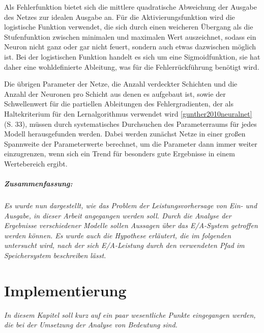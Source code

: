 \documentclass[
	12pt,
	a4paper,
	BCOR10mm,
	DIV14,
	listof=totoc,
	bibliography=totoc,
	headsepline
]{scrreprt}
\begin{document}
Als Fehlerfunktion bietet sich die mittlere quadratische Abweichung der Ausgabe des Netzes zur idealen Ausgabe an.
Für die Aktivierungsfunktion wird die logistische Funktion verwendet, die sich durch einen weicheren Übergang als die Stufenfunktion zwischen minimalen und maximalen Wert auszeichnet, sodass ein Neuron nicht ganz oder gar nicht feuert, sondern auch etwas dazwischen möglich ist. Bei der logistischen Funktion handelt es sich um eine Sigmoidfunktion, sie hat daher eine wohldefinierte Ableitung, was für die Fehlerrückführung benötigt wird. 

Die übrigen Parameter der Netze, die Anzahl verdeckter Schichten und die Anzahl der Neuronen pro Schicht aus denen es aufgebaut ist, sowie der Schwellenwert für die partiellen Ableitungen des Fehlergradienten, der als Haltekriterium für den Lernalgorithmus verwendet wird \ref{gunther2010neuralnet} (S. 33), müssen durch systematisches Durchsuchen des Parameterraums für jedes Modell herausgefunden werden.
Dabei werden zunächst Netze in einer großen Spannweite der Parameterwerte berechnet, um die Parameter dann immer weiter einzugrenzen, wenn sich ein Trend für besonders gute Ergebnisse in einem Wertebereich ergibt.

\paragraph{Zusammenfassung:}
\textit{
Es wurde nun dargestellt, wie das Problem der Leistungsvorhersage von Ein- und Ausgabe, in dieser Arbeit angegangen werden soll.
Durch die Analyse der Ergebnisse verschiedener Modelle sollen Aussagen über das E/A-System getroffen werden können.
Es wurde auch die Hypothese erläutert, die im folgenden untersucht wird, nach der sich E/A-Leistung durch den verwendeten Pfad im Speichersystem beschreiben lässt.  
}


\chapter{Implementierung}
\textit{%
In diesem Kapitel soll kurz auf ein paar wesentliche Punkte eingegangen werden, die bei der Umsetzung der Analyse von Bedeutung sind.
}
\bigskip
\end{document}
